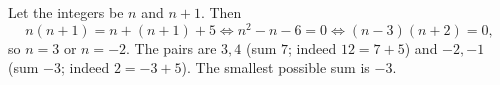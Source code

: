 Let the integers be $n$ and $n+1$. Then
\[n(n+1)=n+(n+1)+5\iff n^2-n-6=0\iff(n-3)(n+2)=0,\]
so $n=3$ or $n=-2$. The pairs are $3,4$ (sum $7$; indeed $12=7+5$) and $-2,-1$ (sum $-3$; indeed $2=-3+5$). The smallest possible sum is $\boxed{-3}$.
